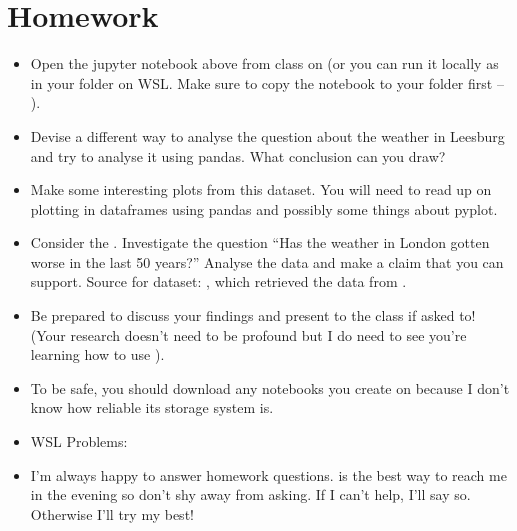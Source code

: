 \documentclass[letterpaper,10pt,english]{jupyterBook}
\begin{document}
\section{Homework}
\label{\detokenize{lessons/hw02:homework}}\begin{itemize}
\item {} 
\sphinxAtStartPar
Open the jupyter notebook above from class on  (or you can run it locally as  in your  folder on WSL. Make sure to copy the notebook to your  folder first – ).

\item {} 
\sphinxAtStartPar
Devise a different way to analyse the question about the weather in Leesburg and try to analyse it using pandas. What conclusion can you draw?

\item {} 
\sphinxAtStartPar
Make some interesting plots from this dataset. You will need to read up on plotting in dataframes using pandas and possibly some things about pyplot.

\item {} 
\sphinxAtStartPar
Consider the {\hyperref[\detokenize{lessons/hw02:../data/london_weather.csv}]{}}. Investigate the question “Has the weather in London gotten worse in the last 50 years?” Analyse the data and make a claim that you can support. Source for dataset: , which retrieved the data from .

\item {} 
\sphinxAtStartPar
Be prepared to discuss your findings and present to the class if asked to! (Your research doesn’t need to be profound but I do need to see you’re learning how to use ).

\item {} 
\sphinxAtStartPar
To be safe, you should download any notebooks you create on  because I don’t know how reliable its storage system is.

\item {} 
\sphinxAtStartPar
WSL Problems: {\hyperref[\detokenize{lessons/wsl::doc}]{}}

\item {} 
\sphinxAtStartPar
{} I’m always happy to answer homework questions.  is the best way to reach me in the evening so don’t shy away from asking. If I can’t help, I’ll say so. Otherwise I’ll try my best!

\end{itemize}
\end{document}
